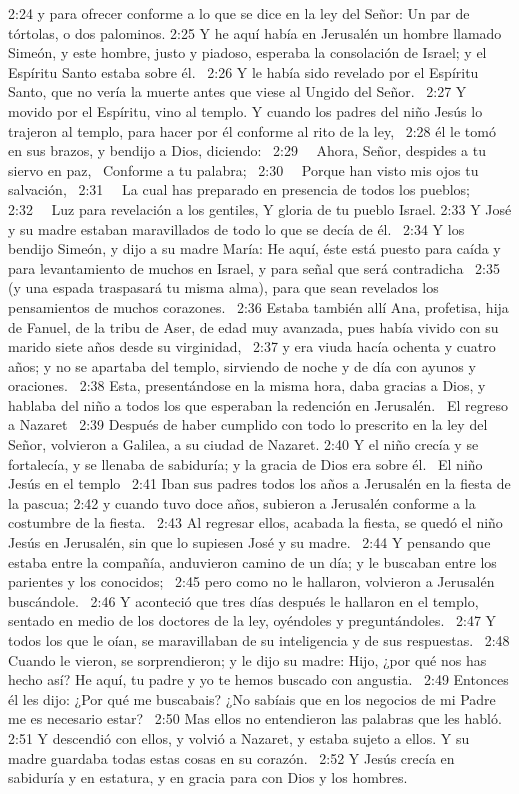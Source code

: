 2:24 y para ofrecer conforme a lo que se dice en la ley del Señor: Un par de tórtolas, o dos palominos. 
2:25 Y he aquí había en Jerusalén un hombre llamado Simeón, y este hombre, justo y piadoso, esperaba la consolación de Israel; y el Espíritu Santo estaba sobre él.  
2:26 Y le había sido revelado por el Espíritu Santo, que no vería la muerte antes que viese al Ungido del Señor.  
2:27 Y movido por el Espíritu, vino al templo. Y cuando los padres del niño Jesús lo trajeron al templo, para hacer por él conforme al rito de la ley,  
2:28 él le tomó en sus brazos, y bendijo a Dios, diciendo:  
2:29   Ahora, Señor, despides a tu siervo en paz,  
Conforme a tu palabra;  
2:30   Porque han visto mis ojos tu salvación,  
2:31   La cual has preparado en presencia de todos los pueblos;  
2:32   Luz para revelación a los gentiles, 
Y gloria de tu pueblo Israel. 
2:33 Y José y su madre estaban maravillados de todo lo que se decía de él.  
2:34 Y los bendijo Simeón, y dijo a su madre María: He aquí, éste está puesto para caída y para levantamiento de muchos en Israel, y para señal que será contradicha  
2:35 (y una espada traspasará tu misma alma), para que sean revelados los pensamientos de muchos corazones.  
2:36 Estaba también allí Ana, profetisa, hija de Fanuel, de la tribu de Aser, de edad muy avanzada, pues había vivido con su marido siete años desde su virginidad,  
2:37 y era viuda hacía ochenta y cuatro años; y no se apartaba del templo, sirviendo de noche y de día con ayunos y oraciones.  
2:38 Esta, presentándose en la misma hora, daba gracias a Dios, y hablaba del niño a todos los que esperaban la redención en Jerusalén.  
El regreso a Nazaret  
2:39 Después de haber cumplido con todo lo prescrito en la ley del Señor, volvieron a Galilea, a su ciudad de Nazaret. 
2:40 Y el niño crecía y se fortalecía, y se llenaba de sabiduría; y la gracia de Dios era sobre él.  
El niño Jesús en el templo  
2:41 Iban sus padres todos los años a Jerusalén en la fiesta de la pascua; 
2:42 y cuando tuvo doce años, subieron a Jerusalén conforme a la costumbre de la fiesta.  
2:43 Al regresar ellos, acabada la fiesta, se quedó el niño Jesús en Jerusalén, sin que lo supiesen José y su madre.  
2:44 Y pensando que estaba entre la compañía, anduvieron camino de un día; y le buscaban entre los parientes y los conocidos;  
2:45 pero como no le hallaron, volvieron a Jerusalén buscándole.  
2:46 Y aconteció que tres días después le hallaron en el templo, sentado en medio de los doctores de la ley, oyéndoles y preguntándoles.  
2:47 Y todos los que le oían, se maravillaban de su inteligencia y de sus respuestas.  
2:48 Cuando le vieron, se sorprendieron; y le dijo su madre: Hijo, ¿por qué nos has hecho así? He aquí, tu padre y yo te hemos buscado con angustia.  
2:49 Entonces él les dijo: ¿Por qué me buscabais? ¿No sabíais que en los negocios de mi Padre me es necesario estar?  
2:50 Mas ellos no entendieron las palabras que les habló.  
2:51 Y descendió con ellos, y volvió a Nazaret, y estaba sujeto a ellos. Y su madre guardaba todas estas cosas en su corazón.  
2:52 Y Jesús crecía en sabiduría y en estatura, y en gracia para con Dios y los hombres. 
